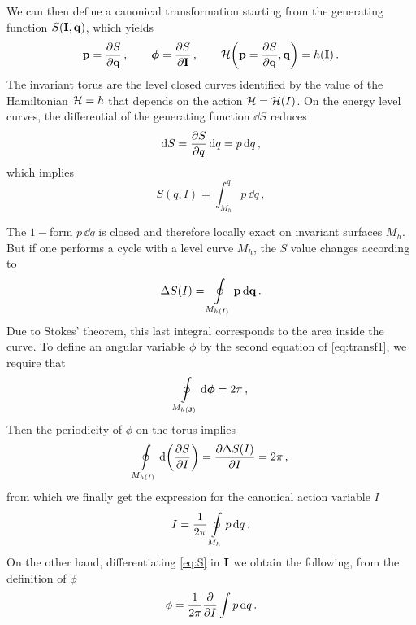 We can then define a canonical transformation starting from the generating function $S(\vb{I},\vb{q})$, which yields
%
\begin{equation}
  \vb{p}=\pdv{S}{\vb{q}}\,, \qquad \boldsymbol{\phi}=\pdv{S}{\vb{I}}\,, \qquad \mathcal{H}\qty(\vb{p}=\pdv{S}{\vb{q}},\vb{q}) = h(\vb{I})\,.
  \label{eq:transf1}
  \end{equation} 
%
The invariant torus are the level closed curves identified by the value of the Hamiltonian $\mathcal{H}=h$ that depends on the action $\mathcal{H}=\mathcal{H}(I)$. On the energy level curves, the differential of the generating function $\dd S$ reduces
%
\begin{equation} 
    \dd S = \pdv{S}{q}\,\dd q = p\,\dd q\,,
\end{equation} 
%
which implies
%
\begin{equation}
    S(q,I) = \int_{M_h}^q p\, \dd q\,,
    \label{eq:S}
\end{equation} 
%

The $1-$form $p\,\dd q$ is closed and therefore locally exact on invariant surfaces $M_h$. But if one performs a cycle with a level curve $M_h$, the $S$ value changes according to
%
\begin{equation}
    \Delta S(I) = \oint\displaylimits_{M_{h(I)}} \vb{p}\, \dd \vb{q} \,.
\end{equation} 
%
Due to Stokes' theorem, this last integral corresponds to the area inside the curve.  To define an angular variable $\phi$ by the second equation of \eqref{eq:transf1}, we require that
%
\begin{equation} 
    \oint\displaylimits_{M_{h(\vb{J})}} \dd\boldsymbol{\phi} = 2\pi\,,  
\end{equation} 
%
Then the periodicity of $\phi$ on the torus implies
%
\begin{equation} 
    \oint\displaylimits_{M_{h(I)}} \dd\qty(\pdv{S}{I}) = \pdv{\Delta S(I)}{I} = 2\pi\,, 
\end{equation}
%
from which we finally get the expression for the canonical action variable $I$
%
\begin{equation}  
    I = \frac{1}{2\pi}\oint\displaylimits_{M_h} p\,\dd q\,.  
\end{equation} 
%
On the other hand, differentiating \eqref{eq:S} in $\vb{I}$ we obtain the following, from the definition of $\phi$
%
\begin{equation} 
    \phi = \frac{1}{2\pi} \pdv{I}\int p\,\dd q\, . 
\end{equation}  


